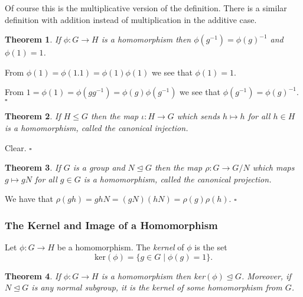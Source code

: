 \documentclass[10pt]{article}
\newtheorem{theorem}{Theorem}[section]
\newenvironment{proof}[1][Proof]{\begin{trivlist}
\item[\hskip \labelsep {\itshape #1}]}{\end{trivlist}}
\newenvironment{definition}[1][Definition]{\begin{trivlist}
\item[\hskip \labelsep {\bfseries #1}]}{\end{trivlist}}
\begin{document}
Of course this is the multiplicative version of the definition. There is a similar definition with addition instead of multiplication in the additive case.

\begin{theorem}
If $\phi : G \to H$ is a homomorphism then $\phi(g^{-1}) = \phi(g)^{-1}$ and $\phi(1) = 1$.
\end{theorem}

\begin{proof}
From $\phi(1) = \phi(1.1) = \phi(1)\phi(1)$ we see that $\phi(1) = 1$.

From $1 = \phi(1) = \phi(gg^{-1}) = \phi(g)\phi(g^{-1})$ we see that $\phi(g^{-1}) = \phi(g)^{-1}$. $\square$
\end{proof}

\begin{theorem}
If $H \leq G$ then the map $\iota : H \to G$ which sends $h \mapsto h$ for all $h \in H$ is a homomorphism, called the canonical injection.
\end{theorem}

\begin{proof}
Clear. $\square$
\end{proof}

\begin{theorem}
If $G$ is a group and $N \mathrel{\unlhd} G$ then the map $\rho : G \to G/N$ which maps $g \mapsto gN$ for all $g \in G$ is a homomorphism, called the canonical projection.
\end{theorem}

\begin{proof}
We have that $\rho(gh) = ghN = (gN)(hN) = \rho(g)\rho(h)$. $\square$
\end{proof}

\subsubsection{The Kernel and Image of a Homomorphism}

\begin{definition}
Let $\phi : G \to H$ be a homomorphism. The \emph{kernel} of $\phi$ is the set
$$\mbox{ker}(\phi) = \{g \in G \;|\; \phi(g) = 1\}.$$
\end{definition}

\begin{theorem}
If $\phi : G \to H$ is a homomorphism then ker$(\phi) \mathrel{\unlhd} G$. Moreover, if $N \mathrel{\unlhd} G$ is any normal subgroup, it is the kernel of some homomorphism from $G$.
\end{theorem}
\end{document}
